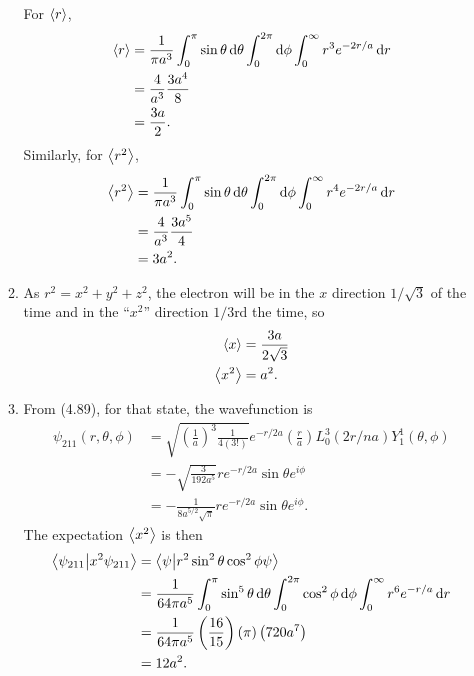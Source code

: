 \documentclass{homework}
\begin{document}
\begin{enumerate}
\begin{enumerate}
				For $\expval{r}$, \begin{align*}
					\expval{r} & = \frac{1}{\pi a^3} \int_0^\pi \sin \theta \dd{\theta} \int_0^{2\pi} \dd{\phi} \int_0^\infty r^3 e^{-2r/a} \dd{r} \\
						& = \frac{4}{a^3} \frac{3a^4}{8} \\
						& = \frac{3a}{2}.
				\end{align*}
				Similarly, for $\expval{r^2}$,  \begin{align*}
					\expval{r^2} & = \frac{1}{\pi a^3} \int_0^\pi \sin \theta \dd{\theta} \int_0^{2\pi} \dd{\phi} \int_0^\infty r^4 e^{-2r/a} \dd{r} \\
					& = \frac{4}{a^3} \frac{3a^5}{4} \\
					& = 3a^2.
				\end{align*}
			
				\item As $r^2 = x^2 + y^2 + z^2$, the electron will be in the $x$ direction $1/\sqrt{3}$ of the time and in the ``$x^2$'' direction $1/3$rd the time, so \begin{align*}
					\expval{x} & = \frac{3a}{2\sqrt{3}}\\
					\expval{x^2} & = 	a^2.
				\end{align*}
			
				\item From (4.89), for that state, the wavefunction is \begin{align*}
					\psi_{211}(r, \theta, \phi) & = \sqrt{ \left(\frac{1}{a}\right)^3 \frac{1}{4(3!)} }
						e^{-r/2a}
						\left( \frac{r}{a} \right)
						L_0^3(2r/na) Y_1^1(\theta, \phi) \\
							& = -\sqrt{ \frac{3}{192a^5} } r e^{-r/2a} \sin\theta e^{i \phi} \\
							& = -\frac{1}{8a^{5/2} \sqrt{\pi}} r e^{-r/2a} \sin \theta e^{i \phi}.
				\end{align*}
				The expectation $\expval{x^2}$ is then \begin{align*}
					\braket{\psi_{211}}{x^2 \psi_{211}} & = \braket{\psi}{r^2 \sin^2\theta \cos^2\phi \psi} \\
						& =  \frac{1}{64 \pi a^5} \int_0^\pi \sin^5 \theta \dd{\theta}
							\int_0^{2\pi} \cos^2 \phi \dd{\phi}
							\int_0^\infty r^6 e^{-r/a} \dd{r} \\
						& = \frac{1}{64 \pi a^5} \left(\frac{16}{15}\right) \left(\pi\right) \left(720a^7\right) \\
						& = 12a^2.
				\end{align*}
			\end{enumerate}
			

\end{enumerate}
\end{document}
